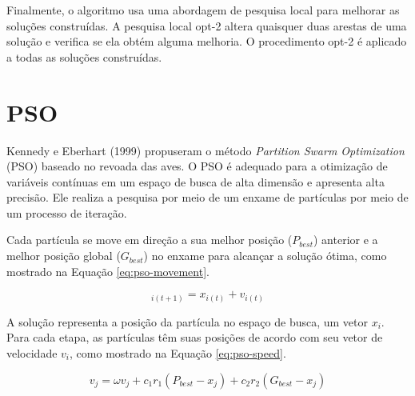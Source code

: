 Finalmente, o algoritmo usa uma abordagem de pesquisa local para melhorar as soluções construídas. A pesquisa local opt-2 altera quaisquer duas arestas de uma solução e verifica se ela obtém alguma melhoria. O procedimento opt-2 é aplicado a todas as soluções construídas.

\section{PSO}
\label{sec-pso}

Kennedy e Eberhart (1999) \cite{kennedy1999particle} propuseram o método \textit{Partition Swarm Optimization} (PSO) baseado no revoada das aves. O PSO é adequado para a otimização de variáveis contínuas em um espaço de busca de alta dimensão e apresenta alta precisão. Ele realiza a pesquisa por meio de um enxame de partículas por meio de um processo de iteração.


Cada partícula se move em direção a sua melhor posição ($P_{best}$) anterior e a melhor posição global ($G_{best}$) no enxame para alcançar a solução ótima, como mostrado na Equação \ref{eq:pso-movement}.

\begin{equation} \label{eq:pso-movement}
    _{i(t+1)} = x_{i(t)} + v_{i(t)}
\end{equation}

A solução representa a posição da partícula no espaço de busca, um vetor $x_i$. Para cada etapa, as partículas têm suas posições de acordo com seu vetor de velocidade $v_i$, como mostrado na Equação \ref{eq:pso-speed}.

\begin{equation} \label{eq:pso-speed}
    v_j = \omega v_j + c_1 r_1(P_{best} - x_j) + c_2 r_2(G_{best} - x_j)
\end{equation} 

